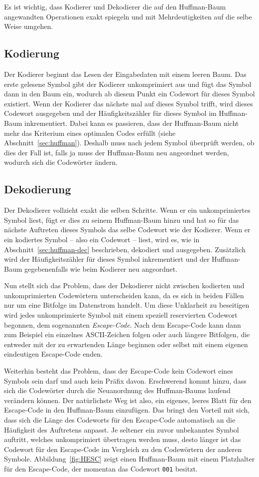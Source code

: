\documentclass[twoside,11pt,a4paper]{article}
\theoremstyle{break}
\begin{document}
Es ist wichtig, dass Kodierer und Dekodierer die auf den Huffman-Baum
angewandten Operationen exakt spiegeln und mit Mehrdeutigkeiten auf
die selbe Weise umgehen.

\subsection{Kodierung}
Der Kodierer beginnt das Lesen der Eingabedaten mit einem leeren
Baum. Das erste gelesene Symbol gibt der Kodierer unkomprimiert aus
und fügt das Symbol dann in den Baum ein, wodurch ab diesem Punkt ein
Codewort für dieses Symbol existiert. Wenn der Kodierer das nächste
mal auf dieses Symbol trifft, wird dieses Codewort ausgegeben und der
Häufigkeitszähler für dieses Symbol im Huffman-Baum inkrementiert.
Dabei kann es passieren, dass der Huffman-Baum nicht mehr das
Kriterium eines optimalen Codes erfüllt (siehe
Abschnitt~\ref{sec:huffman}).  Deshalb muss nach jedem Symbol
überprüft werden, ob dies der Fall ist, falls ja muss der Huffman-Baum
neu angeordnet werden, wodurch sich die Codewörter ändern.

\subsection{Dekodierung}
Der Dekodierer vollzieht exakt die selben Schritte. Wenn er ein
unkomprimiertes Symbol liest, fügt er dies zu seinem Huffman-Baum
hinzu und hat so für das nächste Auftreten dieses Symbols das selbe
Codewort wie der Kodierer. Wenn er ein kodiertes Symbol -- also ein
Codewort -- liest, wird es, wie in Abschnitt~\ref{sec:huffman-dec}
beschrieben, dekodiert und ausgegeben. Zusätzlich wird der
Häufigkeitszähler für dieses Symbol inkrementiert und der Huffman-Baum
gegebenenfalls wie beim Kodierer neu angeordnet.

Nun stellt sich das Problem, dass der Dekodierer nicht zwischen
kodierten und unkomprimierten Codewörtern unterscheiden kann, da es
sich in beiden Fällen nur um eine Bitfolge im Datenstrom handelt. Um
diese Unklarheit zu beseitigen wird jedes unkomprimierte Symbol mit
einem speziell reservierten Codewort begonnen, dem sogenannten
\emph{Escape-Code}.  Nach dem Escape-Code kann dann zum Beispiel ein
einzelnes ASCII-Zeichen folgen oder auch längere Bitfolgen, die
entweder mit der zu erwartenden Länge beginnen oder selbst mit einem
eigenen eindeutigen Escape-Code enden.

Weiterhin besteht das Problem, dass der Escape-Code kein Codewort
eines Symbols sein darf und auch kein Präfix davon. Erschwerend kommt
hinzu, dass sich die Codewörter durch die Neuanordnung des
Huffman-Baums laufend verändern können. Der natürlichste Weg ist also,
ein eigenes, leeres Blatt für den Escape-Code in den Huffman-Baum
einzufügen. Das bringt den Vorteil mit sich, dass sich die Länge des
Codeworts für den Escape-Code automatisch an die Häufigkeit des
Auftretens anpasst. Je seltener ein zuvor unbekanntes Symbol auftritt,
welches unkomprimiert übertragen werden muss, desto länger ist das
Codewort für den Escape-Code im Vergleich zu den Codewörtern der
anderen Symbole. Abbildung~\ref{fig:HESC} zeigt einen Huffman-Baum mit
einem Platzhalter für den Escape-Code, der momentan das Codewort
{\tt001} besitzt.
\end{document}
